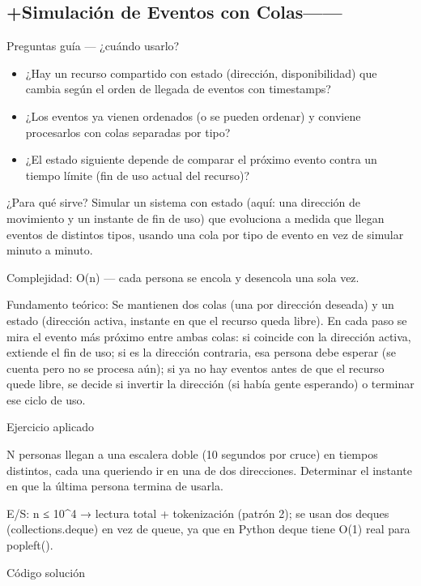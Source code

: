 \subsection{+Simulación de Eventos con Colas------}

Preguntas guía — ¿cuándo usarlo?

\begin{itemize}
\item ¿Hay un recurso compartido con estado (dirección, disponibilidad) que cambia según el orden de llegada de eventos con timestamps?
\item ¿Los eventos ya vienen ordenados (o se pueden ordenar) y conviene procesarlos con colas separadas por tipo?
\item ¿El estado siguiente depende de comparar el próximo evento contra un tiempo límite (fin de uso actual del recurso)?
\end{itemize}

¿Para qué sirve? Simular un sistema con estado (aquí: una dirección de movimiento y un instante de fin de uso) que evoluciona a medida que llegan eventos de distintos tipos, usando una cola por tipo de evento en vez de simular minuto a minuto.

Complejidad: O(n) — cada persona se encola y desencola una sola vez.

Fundamento teórico: Se mantienen dos colas (una por dirección deseada) y un estado (dirección activa, instante en que el recurso queda libre). En cada paso se mira el evento más próximo entre ambas colas: si coincide con la dirección activa, extiende el fin de uso; si es la dirección contraria, esa persona debe esperar (se cuenta pero no se procesa aún); si ya no hay eventos antes de que el recurso quede libre, se decide si invertir la dirección (si había gente esperando) o terminar ese ciclo de uso.

Ejercicio aplicado

N personas llegan a una escalera doble (10 segundos por cruce) en tiempos distintos, cada una queriendo ir en una de dos direcciones. Determinar el instante en que la última persona termina de usarla.

E/S: n ≤ 10\textasciicircum{}4 → lectura total + tokenización (patrón 2); se usan dos deques (collections.deque) en vez de queue, ya que en Python deque tiene O(1) real para popleft().

Código solución

